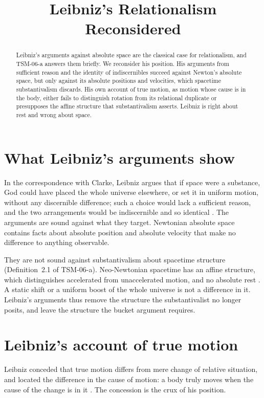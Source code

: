 \documentclass{situationist-preprint}
\title{Leibniz's Relationalism Reconsidered}
\begin{document}
\maketitle

\begin{abstract}
Leibniz's arguments against absolute space are the classical case for relationalism, and TSM-06-a answers them briefly. We reconsider his position. His arguments from sufficient reason and the identity of indiscernibles succeed against Newton's absolute space, but only against its absolute positions and velocities, which spacetime substantivalism discards. His own account of true motion, as motion whose cause is in the body, either fails to distinguish rotation from its relational duplicate or presupposes the affine structure that substantivalism asserts. Leibniz is right about rest and wrong about space.
\end{abstract}

\section{What Leibniz's arguments show}

In the correspondence with Clarke, Leibniz argues that if space were a substance, God could have placed the whole universe elsewhere, or set it in uniform motion, without any discernible difference; such a choice would lack a sufficient reason, and the two arrangements would be indiscernible and so identical \citep{Leibniz1716}. The arguments are sound against what they target. Newtonian absolute space contains facts about absolute position and absolute velocity that make no difference to anything observable.

They are not sound against substantivalism about spacetime structure (Definition~2.1 of TSM-06-a). Neo-Newtonian spacetime has an affine structure, which distinguishes accelerated from unaccelerated motion, and no absolute rest \citep{Stein1967,Earman1989}. A static shift or a uniform boost of the whole universe is not a difference in it. Leibniz's arguments thus remove the structure the substantivalist no longer posits, and leave the structure the bucket argument requires.

\section{Leibniz's account of true motion}

Leibniz conceded that true motion differs from mere change of relative situation, and located the difference in the cause of motion: a body truly moves when the cause of the change is in it \citep[fifth letter, §53]{Leibniz1716}. The concession is the crux of his position.
\end{document}
